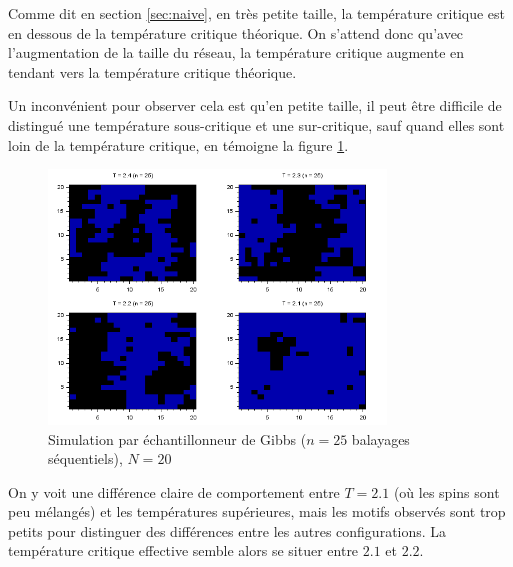 \documentclass[a4paper,11pt]{article}
\begin{document}
Comme dit en section \ref{sec:naive}, en très petite taille, la température critique est en dessous de la température critique théorique. On s'attend donc qu'avec l'augmentation de la taille du réseau, la température critique augmente en tendant vers la température critique théorique.

Un inconvénient pour observer cela est qu'en petite taille, il peut être difficile de distingué une température sous-critique et une sur-critique, sauf quand elles sont loin de la température critique, en témoigne la figure \ref{fig:tc_gibbs_N20_n25}.
\begin{figure}[!htbp]
	\label{fig:tc_gibbs_N20_n25}
	\includegraphics[width=0.8\textwidth]{temperature_critique_gibbs_N20_n25.png}
	\caption{Simulation par échantillonneur de Gibbs ($n = 25$ balayages séquentiels), $N = 20$}
\end{figure}
On y voit une différence claire de comportement entre $T = 2.1$ (où les spins sont peu mélangés) et les températures supérieures, mais les motifs observés sont trop petits pour distinguer des différences entre les autres configurations. La température critique effective semble alors se situer entre $2.1$ et $2.2$.
\end{document}
